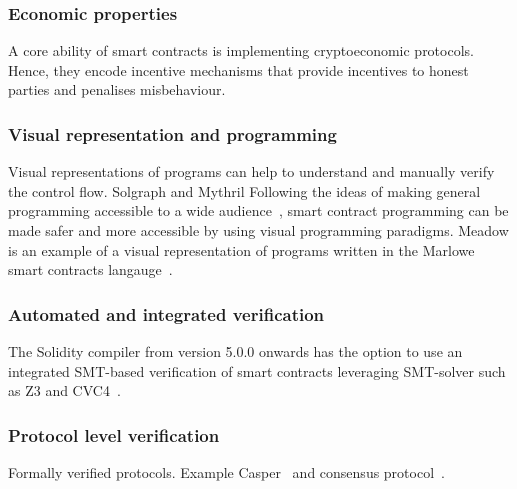 \subsubsection{Economic properties}
A core ability of smart contracts is implementing cryptoeconomic protocols.
Hence, they encode incentive mechanisms that provide incentives to honest parties and penalises misbehaviour.

\subsubsection{Visual representation and programming}
Visual representations of programs can help to understand and manually verify the control flow. 
Solgraph and Mythril
Following the ideas of making general programming accessible to a wide audience~\cite{Resnick2009}, smart contract programming can be made safer and more accessible by using visual programming paradigms.
Meadow is an example of a visual representation of programs written in the Marlowe smart contracts langauge~\cite{Seijas2018}.




\subsubsection{Automated and integrated verification}
The Solidity compiler from version 5.0.0 onwards has the option to use an integrated SMT-based verification of smart contracts leveraging SMT-solver such as Z3 and CVC4~\cite{Alt2018}.

\subsubsection{Protocol level verification}
Formally verified protocols. Example Casper~\cite{Palmskog2018} and consensus protocol~\cite{Pirlea2018}. 





